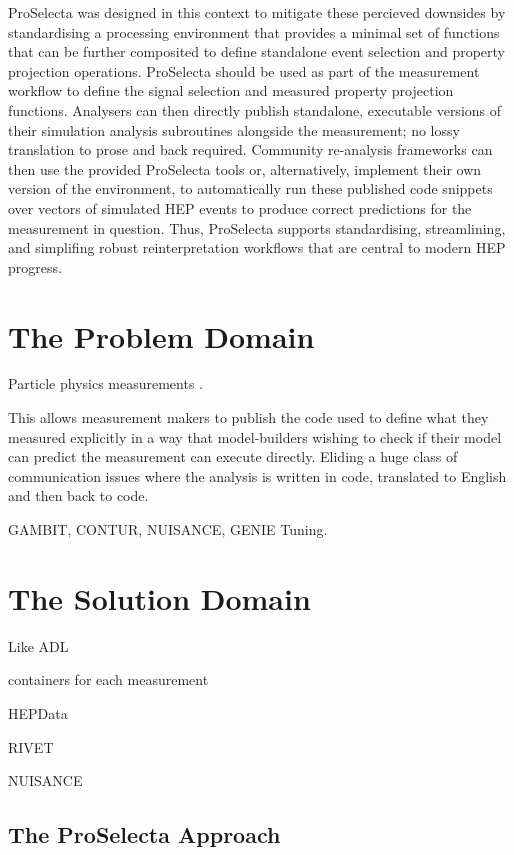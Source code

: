 \documentclass{SciPost}
\newcommand{\proselecta}{{\sc ProSelecta}}
\begin{document}
\proselecta{} was designed in this context to mitigate these percieved downsides by standardising a processing environment that provides a minimal set of functions that can be further composited to define standalone event selection and property projection operations. \proselecta{} should be used as part of the measurement workflow to define the signal selection and measured property projection functions. Analysers can then directly publish standalone, executable versions of their simulation analysis subroutines alongside the measurement; no lossy translation to prose and back required. Community re-analysis frameworks can then use the provided \proselecta{} tools or, alternatively, implement their own version of the environment, to automatically run these published code snippets over vectors of simulated HEP events to produce correct predictions for the measurement in question. Thus, \proselecta{} supports standardising, streamlining, and simplifing robust reinterpretation workflows that are central to modern HEP progress.


\section{The Problem Domain}
\label{sec:problem}

Particle physics measurements .

This allows measurement makers to publish the code used to define what they measured explicitly in a way that model-builders wishing to check if their model can predict the measurement can execute directly. Eliding a huge class of communication issues where the analysis is written in code, translated to English and then back to code.

GAMBIT, CONTUR, NUISANCE, GENIE Tuning.

\section{The Solution Domain}

Like ADL

containers for each measurement

HEPData

RIVET

NUISANCE

\subsection{The \proselecta{} Approach}
\label{ssec:approach}
\end{document}

